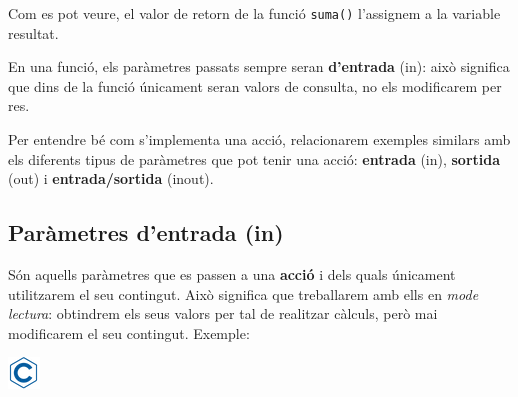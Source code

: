 \documentclass[
]{book}
\begin{document}
Com es pot veure, el valor de retorn de la funció \texttt{suma()} l'assignem a la variable resultat.

En una funció, els paràmetres passats sempre seran \textbf{d'entrada} (in): això significa que dins de la funció únicament seran valors de consulta, no els modificarem per res.

Per entendre bé com s'implementa una acció, relacionarem exemples similars amb els diferents tipus de paràmetres que pot tenir una acció: \textbf{entrada} (in), \textbf{sortida} (out) i \textbf{entrada/sortida} (inout).

\hypertarget{paruxe0metres-dentrada-in}{%
\subsection{Paràmetres d'entrada (in)}\label{paruxe0metres-dentrada-in}}

Són aquells paràmetres que es passen a una \textbf{acció} i dels quals únicament utilitzarem el seu contingut. Això significa que treballarem amb ells en \emph{mode lectura}: obtindrem els seus valors per tal de realitzar càlculs, però mai modificarem el seu contingut. Exemple:

\includegraphics{./img/c.png}
\end{document}

